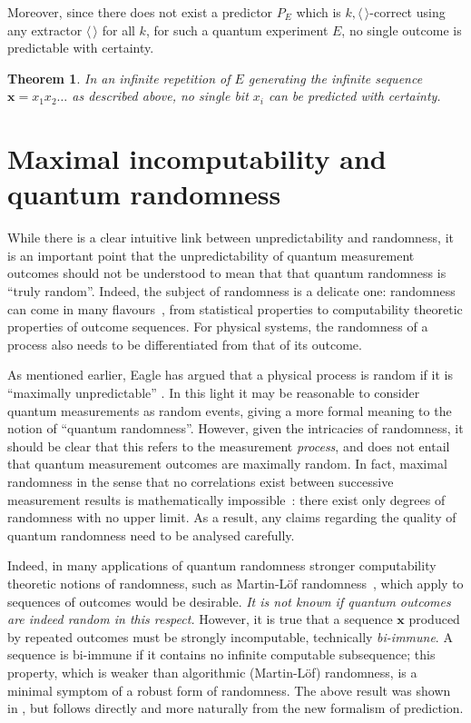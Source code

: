 \documentclass[%
 superscriptaddress,
 preprint,
 showpacs,
 showkeys,
 preprintnumbers,
  amsmath,amssymb,
  aps,
 pra,
  longbibliography,
  floatfix,
 ]{revtex4-1}
\newtheorem{theorem}{Theorem}
\theoremstyle{definition}
\newcommand{\x}{\mathbf{x}}
\begin{document}
Moreover, since there does not exist a predictor $P_E$ which is $k,\langle \, \rangle$-correct using any extractor $\langle\, \rangle$ for all $k$, for such a quantum experiment $E$, no single outcome is predictable with certainty.
\begin{theorem} \label{unpredictsingle}
In an infinite repetition of $E$  generating the infinite sequence $\x=x_1x_2\dots$ as described above, no single bit $x_i$ can be predicted with certainty.
\end{theorem}


\section{Maximal incomputability and quantum randomness}

While there is a clear intuitive link between unpredictability and randomness, it is an important point that the unpredictability of quantum measurement outcomes should not be understood to mean that that quantum randomness is ``truly random''.
Indeed, the subject of randomness is a delicate one: randomness can come in many flavours~\cite{DH}, from statistical properties to computability theoretic properties of outcome sequences.
For physical systems, the randomness of a process also needs to be differentiated from that of its outcome.

As mentioned earlier, Eagle has argued that a physical process is random if it is ``maximally unpredictable'' \cite{Eagle:2005ys}.
In this light it may be reasonable to consider quantum measurements as random events, giving a more formal meaning to the notion of ``quantum randomness''.
However, given the intricacies of randomness, it should be clear that this refers to the measurement \emph{process}, and does not entail that quantum measurement outcomes are maximally random.
In fact, maximal randomness in the sense that no correlations exist between successive measurement results is mathematically impossible~\cite{GS-90,calude:02}: there exist only degrees of randomness with no upper limit.
As a result, any claims regarding the quality of quantum randomness need to be analysed carefully.

Indeed, in many applications of quantum randomness stronger computability theoretic notions of randomness, such as Martin-L\"of randomness~\cite{calude:02}, which apply to sequences of outcomes would be desirable.
{\em It is not known if quantum outcomes are indeed random in this respect.}
However, it is true that a sequence $\x$ produced by repeated outcomes must be strongly incomputable, technically {\em bi-immune}. A  sequence is bi-immune if it contains no infinite computable subsequence; this property, which is weaker than algorithmic (Martin-L\"of) randomness, is a minimal symptom of a robust form of randomness.
The above result was shown in \cite{svozil-2006-ran,2012-incomput-proofsCJ}, but follows directly and more naturally from the new formalism of prediction.
\end{document}
